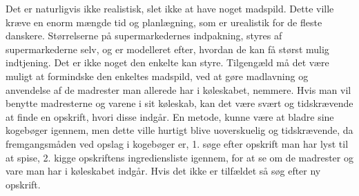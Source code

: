 Det er naturligvis ikke realistisk, slet ikke at have noget madspild. Dette ville kræve en enorm mængde tid og planlægning, som er urealistik for de fleste danskere. Størrelserne på supermarkedernes indpakning, styres af supermarkederne selv, og er modelleret efter, hvordan de kan få størst mulig indtjening. Det er ikke noget den enkelte kan styre. Tilgengæld må det være muligt at formindske den enkeltes madspild, ved at gøre madlavning og 
anvendelse af de madrester man allerede har i køleskabet, nemmere. Hvis man vil benytte madresterne og varene i sit køleskab, kan det være svært og 
tidskrævende at finde en opskrift, hvori disse indgår. En metode, kunne være at bladre sine kogebøger igennem, men dette ville hurtigt blive uoverskuelig 
og tidskrævende, da fremgangsmåden ved opslag i kogebøger er, 1. søge efter opskrift man har lyst til at spise, 2. kigge opskriftens ingrediensliste 
igennem, for at se om de madrester og vare man har i køleskabet indgår. Hvis det ikke er tilfældet så søg efter ny opskrift.    

